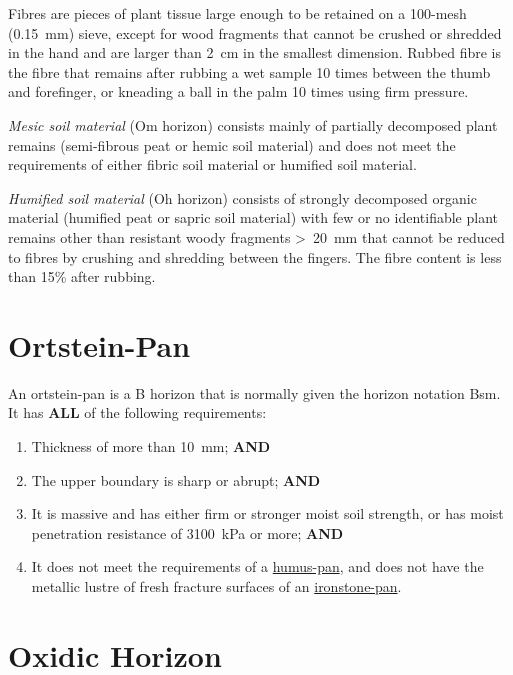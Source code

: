 \documentclass[
  letterpaper,
  DIV=11,
  numbers=noendperiod]{scrreprt}
\providecommand{\tightlist}{%
  \setlength{\itemsep}{0pt}\setlength{\parskip}{0pt}}\usepackage{longtable,booktabs,array}
\begin{document}
Fibres are pieces of plant tissue large enough to be retained on a
100-mesh (0.15~mm) sieve, except for wood fragments that cannot be
crushed or shredded in the hand and are larger than 2~cm in the smallest
dimension. Rubbed fibre is the fibre that remains after rubbing a wet
sample 10 times between the thumb and forefinger, or kneading a ball in
the palm 10 times using firm pressure.

\emph{Mesic soil material} (Om horizon) consists mainly of partially
decomposed plant remains (semi-fibrous peat or hemic soil material) and
does not meet the requirements of either fibric soil material or
humified soil material.

\emph{Humified soil material} (Oh horizon) consists of strongly
decomposed organic material (humified peat or sapric soil material) with
few or no identifiable plant remains other than resistant woody
fragments \textgreater~20~mm that cannot be reduced to fibres by
crushing and shredding between the fingers. The fibre content is less
than 15\% after rubbing.

\hypertarget{sec-diag-opan}{%
\section{Ortstein-Pan}\label{sec-diag-opan}}

An ortstein-pan is a B horizon that is normally given the horizon
notation Bsm. It has \textbf{ALL} of the following requirements:

\begin{enumerate}
\def\labelenumi{\arabic{enumi}.}
\tightlist
\item
  Thickness of more than 10~mm; \textbf{AND}
\item
  The upper boundary is sharp or abrupt; \textbf{AND}
\item
  It is massive and has either firm or stronger moist soil strength, or
  has moist penetration resistance of 3100~kPa or more; \textbf{AND}
\item
  It does not meet the requirements of a
  \protect\hyperlink{sec-diag-hpan}{humus-pan}, and does not have the
  metallic lustre of fresh fracture surfaces of an
  \protect\hyperlink{sec-diag-ipan}{ironstone-pan}.
\end{enumerate}

\hypertarget{sec-diag-oxh}{%
\section{Oxidic Horizon}\label{sec-diag-oxh}}
\end{document}

